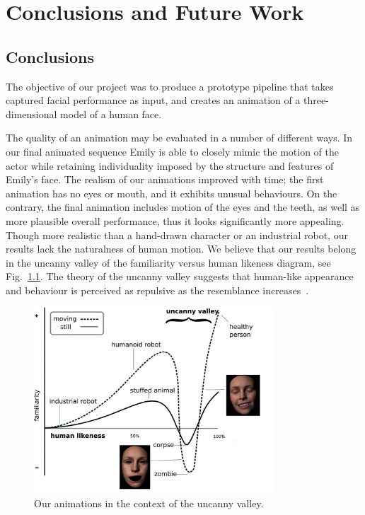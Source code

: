 \chapter{Conclusions and Future Work}
\section{Conclusions}
The objective of our project was to produce a prototype pipeline that takes captured facial performance as input, and creates an animation of a three-dimensional model of a human face. 

The quality of an animation may be evaluated in a number of different ways. In our final animated sequence Emily is able to closely mimic the motion of the actor while retaining individuality imposed by the structure and features of Emily's face. The realism of our animations improved with time; the first animation has no eyes or mouth, and it exhibits unusual behaviours. On the contrary, the final animation includes motion of the eyes and the teeth, as well as more plausible overall performance, thus it looks significantly more appealing. Though more realistic than a hand-drawn character or an industrial robot, our results lack the naturalness of human motion. We believe that our results belong in the uncanny valley of the familiarity versus human likeness diagram, see Fig.~\ref{fig:UV}. The theory of the uncanny valley suggests that human-like appearance and behaviour is perceived as repulsive as the resemblance increases~\cite{UV}.
\begin{figure}[htbp!]
\centering
\includegraphics[width=0.8\textwidth]{img/UV}
	\caption{Our animations in the context of the uncanny valley.}
	\label{fig:UV}
\end{figure}

